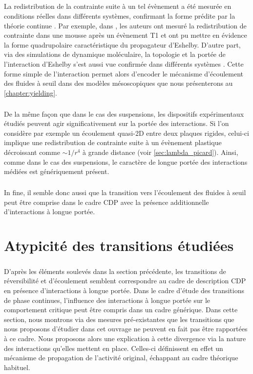 \subparagraph{}La redistribution de la contrainte suite à un tel évènement a été mesurée en conditions réelles dans différents systèmes, confirmant la forme prédite par la théorie continue \cite{desmond_measurement_2015, schott_multiscale_2024, jensen_local_2014}. Par exemple, dans \cite{schott_multiscale_2024}, les auteurs ont mesuré la redistribution de contrainte dans une mousse après un évènement T1 et ont pu mettre en évidence la forme quadrupolaire caractéristique du propagateur d'Eshelby. D'autre part, via des simulations de dynamique moléculaire, la topologie et la portée de l'interaction d'Eshelby s'est aussi vue confirmée dans différents systèmes \cite{kabla_local_2003, maloney_amorphous_2006, tanguy_plastic_2006}. Cette forme simple de l'interaction permet alors d'encoder le mécanisme d'écoulement des fluides à seuil dans des modèles mésoscopiques que nous présenterons au \autoref{chapter:yielding}.

\subparagraph{}De la même façon que dans le cas des suspensions, les dispositifs expérimentaux étudiés peuvent agir significativement sur la portée des interactions. Si l'on considère par exemple un écoulement quasi-2D entre deux plaques rigides, celui-ci implique une redistribution de contrainte suite à un évènement plastique décroissant comme $\sim 1/r^4$ à grande distance (voir \autoref{sec:lambda_picard}). Ainsi, comme dans le cas des suspensions, le caractère de longue portée des interactions médiées est génériquement présent.

\subparagraph{}In fine, il semble donc aussi que la transition vers l'écoulement des fluides à seuil peut être comprise dans le cadre CDP avec la présence additionnelle d'interactions à longue portée.

\section{Atypicité des transitions étudiées}

\subparagraph{}D'après les éléments soulevés dans la section précédente, les transitions de réversibilité et d'écoulement semblent correspondre au cadre de description CDP en présence d'interactions à longue portée. Dans le cadre d'étude des transitions de phase continues, l'influence des interactions à longue portée sur le comportement critique peut être compris dans un cadre générique. Dans cette section, nous montrons via des mesures pré-existantes que les transitions que nous proposons d'étudier dans cet ouvrage ne peuvent en fait pas être rapportées à ce cadre. Nous proposons alors une explication à cette divergence via la nature des interactions qu'elles mettent en place. Celles-ci définissent en effet un mécanisme de propagation de l'activité original, échappant au cadre théorique habituel.

